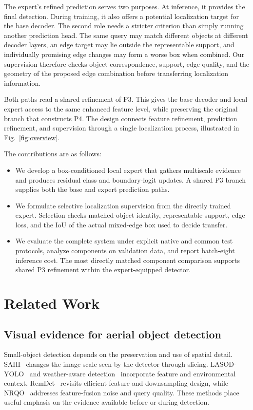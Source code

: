 The expert's refined prediction serves two purposes. At inference, it provides the final detection. During training, it also offers a potential localization target for the base decoder. The second role needs a stricter criterion than simply running another prediction head. The same query may match different objects at different decoder layers, an edge target may lie outside the representable support, and individually promising edge changes may form a worse box when combined. Our supervision therefore checks object correspondence, support, edge quality, and the geometry of the proposed edge combination before transferring localization information.

Both paths read a shared refinement of P3. This gives the base decoder and local expert access to the same enhanced feature level, while preserving the original branch that constructs P4. The design connects feature refinement, prediction refinement, and supervision through a single localization process, illustrated in Fig.~\ref{fig:overview}.

The contributions are as follows:
\begin{itemize}
\item We develop a box-conditioned local expert that gathers multiscale evidence and produces residual class and boundary-logit updates. A shared P3 branch supplies both the base and expert prediction paths.
\item We formulate selective localization supervision from the directly trained expert. Selection checks matched-object identity, representable support, edge loss, and the IoU of the actual mixed-edge box used to decide transfer.
\item We evaluate the complete system under explicit native and common test protocols, analyze components on validation data, and report batch-eight inference cost. The most directly matched component comparison supports shared P3 refinement within the expert-equipped detector.
\end{itemize}

\section{Related Work}
\subsection{Visual evidence for aerial object detection}
Small-object detection depends on the preservation and use of spatial detail. SAHI~\cite{akyon2022sahi} changes the image scale seen by the detector through slicing. LASOD-YOLO~\cite{wang2026lasod} and weather-aware detection~\cite{kim2024weather} incorporate feature and environmental context. RemDet~\cite{li2025remdet} revisits efficient feature and downsampling design, while NRQO~\cite{fang2025nrqo} addresses feature-fusion noise and query quality. These methods place useful emphasis on the evidence available before or during detection.

